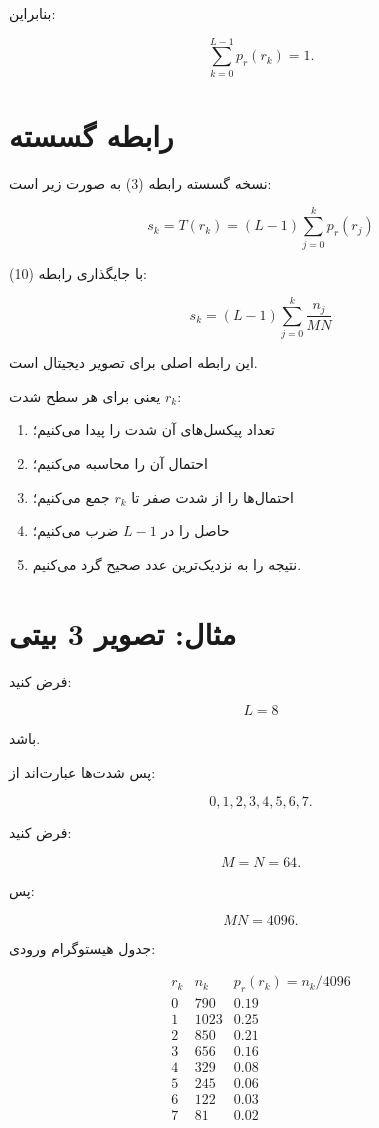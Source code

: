 \documentclass[12pt,a4paper]{article}
\begin{document}
	بنابراین:
	
	\[
	\sum_{k=0}^{L-1}p_r(r_k)=1.
	\]
	
	
	\section{رابطه گسسته }
	
	نسخه گسسته رابطه (3) به صورت زیر است:
	
	\[
	\boxed{
		s_k
		=
		T(r_k)
		=
		(L-1)
		\sum_{j=0}^{k}
		p_r(r_j)
	}
	\tag{11}
	\]
	
	با جایگذاری رابطه (10):
	
	\[
	\boxed{
		s_k
		=
		(L-1)
		\sum_{j=0}^{k}
		\frac{n_j}{MN}
	}
	\tag{12}
	\]
	
	این رابطه اصلی  برای تصویر دیجیتال است.
	
	یعنی برای هر سطح شدت $r_k$:
	
	\begin{enumerate}
		\item تعداد پیکسل‌های آن شدت را پیدا می‌کنیم؛
		\item احتمال آن را محاسبه می‌کنیم؛
		\item احتمال‌ها را از شدت صفر تا $r_k$ جمع می‌کنیم؛
		\item حاصل را در $L-1$ ضرب می‌کنیم؛
		\item نتیجه را به نزدیک‌ترین عدد صحیح گرد می‌کنیم.
	\end{enumerate}
	
	
	\section{مثال: تصویر 3 بیتی}
	
	فرض کنید:
	
	\[
	L=8
	\]
	
	باشد.
	
	پس شدت‌ها عبارت‌اند از:
	
	\[
	0,1,2,3,4,5,6,7.
	\]
	
	فرض کنید:
	
	\[
	M=N=64.
	\]
	
	پس:
	
	\[
	MN=4096.
	\]
	
	جدول هیستوگرام ورودی:
	
	\[
	\begin{array}{c|c|c}
		r_k & n_k & p_r(r_k)=n_k/4096\\
		\hline
		0&790&0.19\\
		1&1023&0.25\\
		2&850&0.21\\
		3&656&0.16\\
		4&329&0.08\\
		5&245&0.06\\
		6&122&0.03\\
		7&81&0.02
	\end{array}
	\]
	
\end{document}
